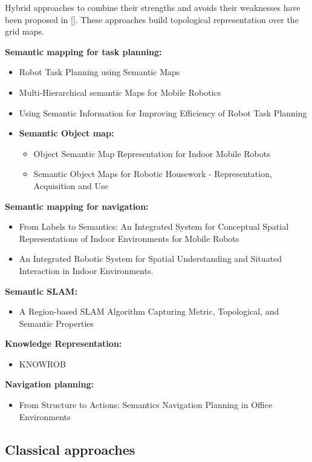 Hybrid approaches to combine their strengths and avoids their weaknesses have been proposed in [].
These approaches build topological representation over the grid maps.


\textbf{Semantic mapping for task planning:}
\begin{itemize}
 \item Robot Task Planning using Semantic Maps
 \item Multi-Hierarchical semantic Maps for Mobile Robotics
 \item Using Semantic Information for Improving Efficiency of Robot Task Planning
 \item \textbf{Semantic Object map:}
  \begin{itemize}
    \item Object Semantic Map Representation for Indoor Mobile Robots
    \item Semantic Object Maps for Robotic Housework - Representation, Acquisition and Use
  \end{itemize}
\end{itemize}

\textbf{Semantic mapping for navigation:}
\begin{itemize} 
 \item From Labels to Semantics: An Integrated System for Conceptual Spatial Representations of Indoor Environments for Mobile Robots
 \item An Integrated Robotic System for Spatial Understanding and Situated Interaction in Indoor Environments.
\end{itemize} 
\textbf{Semantic SLAM:} 
\begin{itemize}
 \item A Region-based SLAM Algorithm Capturing Metric, Topological, and Semantic Properties
\end{itemize}
\textbf{Knowledge Representation:} 
\begin{itemize}
 \item KNOWROB
\end{itemize}
\textbf{Navigation planning:} 
\begin{itemize}
 \item From Structure to Actions: Semantics Navigation Planning in Office Environments
\end{itemize}



\subsection{Classical approaches}
